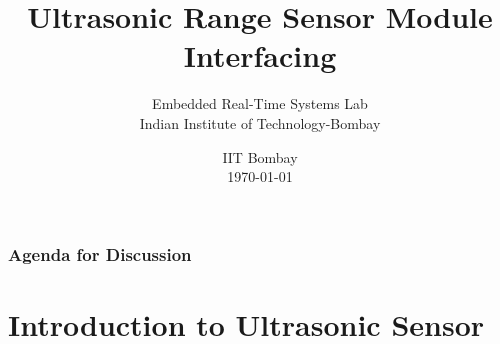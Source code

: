 \documentclass[table,10pt,red]{beamer}	%
\title
[
	Ultrasonic Sensor Module Interfacing	%
	\hspace{0.5cm}
	\insertframenumber/\inserttotalframenumber
]
{
Ultrasonic Range Sensor Module Interfacing
}
\author
[
	www.e-yantra.org 	%
]
{ 
	Embedded Real-Time Systems Lab\\
  Indian Institute of Technology-Bombay \\
}
\date
{
IIT Bombay \\ {\today}	%
}
\begin{document}

\begin{frame}	%
	\titlepage %
\end{frame}

\begin{frame}
	\frametitle{Agenda for Discussion} %
	\tableofcontents %
\end{frame}


\section{Introduction to Ultrasonic Sensor} %
\end{document}
